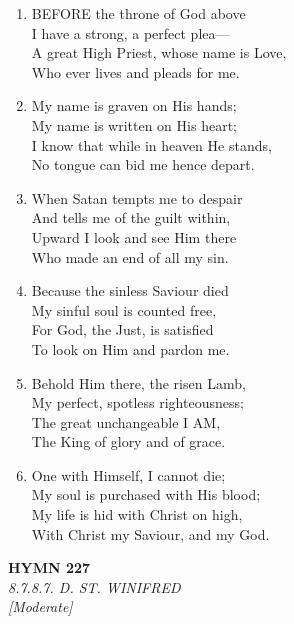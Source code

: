 \begin{enumerate}
    \item BEFORE the throne of God above \\
        I have a strong, a perfect plea--- \\
        A great High Priest, whose name is Love, \\
        Who ever lives and pleads for me.

    \item My name is graven on His hands; \\
        My name is written on His heart; \\
        I know that while in heaven He stands, \\
        No tongue can bid me hence depart.

    \item When Satan tempts me to despair \\
        And tells me of the guilt within, \\
        Upward I look and see Him there \\
        Who made an end of all my sin.

    \item Because the sinless Saviour died \\
        My sinful soul is counted free, \\
        For God, the Just, is satisfied \\
        To look on Him and pardon me.

    \item Behold Him there, the risen Lamb, \\
        My perfect, spotless righteousness; \\
        The great unchangeable I AM, \\
        The King of glory and of grace.

    \item One with Himself, I cannot die; \\
        My soul is purchased with His blood; \\
        My life is hid with Christ on high, \\
        With Christ my Saviour, and my God.

\end{enumerate}

\newpage
\begin{center}
    {\Large \textbf{HYMN 227}}
    \\
    \textit{8.7.8.7. D. ST. WINIFRED}
    \\
    \textit{\small [Moderate]}
\end{center}
\vspace{1em}

